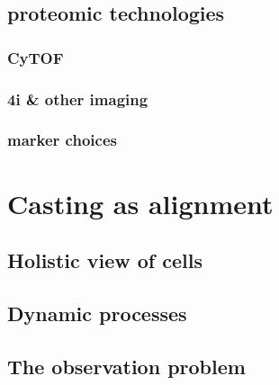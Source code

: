 \subsection{proteomic technologies}
\subsubsection{CyTOF}
\subsubsection{4i \& other imaging}
\subsubsection{marker choices}

\section{Casting as alignment}
\subsection{Holistic view of cells}
\subsection{Dynamic processes}
\subsection{The observation problem}
